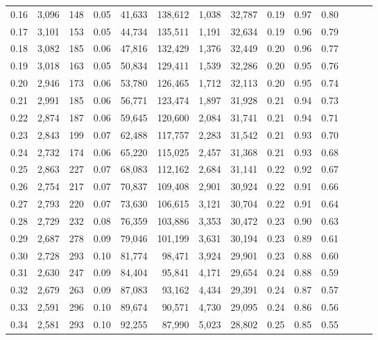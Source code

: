 \begin{tabular}{rrrrrrrrrrrrrr}
0.16 &  3,096 &  148 &  0.05 &   41,633 &  138,612 &   1,038 &  32,787 &  0.19 &  0.97 &      0.80 \\
0.17 &  3,101 &  153 &  0.05 &   44,734 &  135,511 &   1,191 &  32,634 &  0.19 &  0.96 &      0.79 \\
0.18 &  3,082 &  185 &  0.06 &   47,816 &  132,429 &   1,376 &  32,449 &  0.20 &  0.96 &      0.77 \\
0.19 &  3,018 &  163 &  0.05 &   50,834 &  129,411 &   1,539 &  32,286 &  0.20 &  0.95 &      0.76 \\
0.20 &  2,946 &  173 &  0.06 &   53,780 &  126,465 &   1,712 &  32,113 &  0.20 &  0.95 &      0.74 \\
0.21 &  2,991 &  185 &  0.06 &   56,771 &  123,474 &   1,897 &  31,928 &  0.21 &  0.94 &      0.73 \\
0.22 &  2,874 &  187 &  0.06 &   59,645 &  120,600 &   2,084 &  31,741 &  0.21 &  0.94 &      0.71 \\
0.23 &  2,843 &  199 &  0.07 &   62,488 &  117,757 &   2,283 &  31,542 &  0.21 &  0.93 &      0.70 \\
0.24 &  2,732 &  174 &  0.06 &   65,220 &  115,025 &   2,457 &  31,368 &  0.21 &  0.93 &      0.68 \\
0.25 &  2,863 &  227 &  0.07 &   68,083 &  112,162 &   2,684 &  31,141 &  0.22 &  0.92 &      0.67 \\
0.26 &  2,754 &  217 &  0.07 &   70,837 &  109,408 &   2,901 &  30,924 &  0.22 &  0.91 &      0.66 \\
0.27 &  2,793 &  220 &  0.07 &   73,630 &  106,615 &   3,121 &  30,704 &  0.22 &  0.91 &      0.64 \\
0.28 &  2,729 &  232 &  0.08 &   76,359 &  103,886 &   3,353 &  30,472 &  0.23 &  0.90 &      0.63 \\
0.29 &  2,687 &  278 &  0.09 &   79,046 &  101,199 &   3,631 &  30,194 &  0.23 &  0.89 &      0.61 \\
0.30 &  2,728 &  293 &  0.10 &   81,774 &   98,471 &   3,924 &  29,901 &  0.23 &  0.88 &      0.60 \\
0.31 &  2,630 &  247 &  0.09 &   84,404 &   95,841 &   4,171 &  29,654 &  0.24 &  0.88 &      0.59 \\
0.32 &  2,679 &  263 &  0.09 &   87,083 &   93,162 &   4,434 &  29,391 &  0.24 &  0.87 &      0.57 \\
0.33 &  2,591 &  296 &  0.10 &   89,674 &   90,571 &   4,730 &  29,095 &  0.24 &  0.86 &      0.56 \\
0.34 &  2,581 &  293 &  0.10 &   92,255 &   87,990 &   5,023 &  28,802 &  0.25 &  0.85 &      0.55 \\

\end{tabular}
